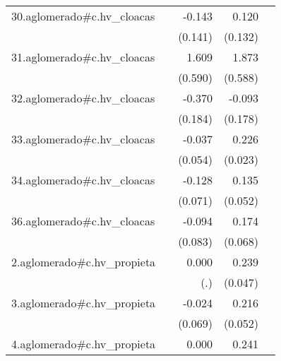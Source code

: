 {\begin{longtable}{l*{4}{D{.}{.}{-1}}}
\addlinespace
30.aglomerado#c.hv\_cloacas&                     &      -0.143         &       0.120         &                     \\
            &                     &     (0.141)         &     (0.132)         &                     \\
\addlinespace
31.aglomerado#c.hv\_cloacas&                     &       1.609\sym{**} &       1.873\sym{**} &                     \\
            &                     &     (0.590)         &     (0.588)         &                     \\
\addlinespace
32.aglomerado#c.hv\_cloacas&                     &      -0.370\sym{*}  &      -0.093         &                     \\
            &                     &     (0.184)         &     (0.178)         &                     \\
\addlinespace
33.aglomerado#c.hv\_cloacas&                     &      -0.037         &       0.226\sym{***}&                     \\
            &                     &     (0.054)         &     (0.023)         &                     \\
\addlinespace
34.aglomerado#c.hv\_cloacas&                     &      -0.128         &       0.135\sym{**} &                     \\
            &                     &     (0.071)         &     (0.052)         &                     \\
\addlinespace
36.aglomerado#c.hv\_cloacas&                     &      -0.094         &       0.174\sym{*}  &                     \\
            &                     &     (0.083)         &     (0.068)         &                     \\
\addlinespace
2.aglomerado#c.hv\_propieta&                     &       0.000         &       0.239\sym{***}&                     \\
            &                     &         (.)         &     (0.047)         &                     \\
\addlinespace
3.aglomerado#c.hv\_propieta&                     &      -0.024         &       0.216\sym{***}&                     \\
            &                     &     (0.069)         &     (0.052)         &                     \\
\addlinespace
4.aglomerado#c.hv\_propieta&                     &       0.000         &       0.241\sym{***}&                     \\

\end{longtable}}
